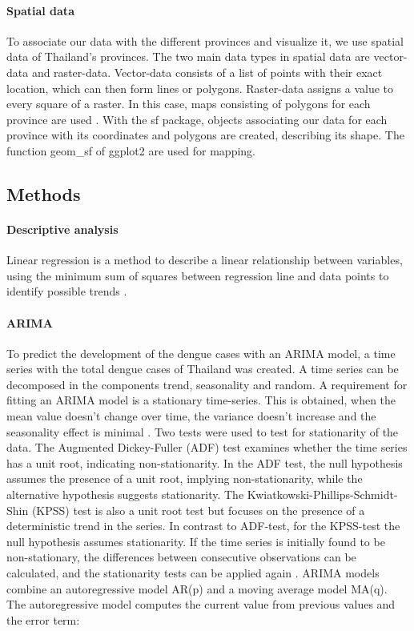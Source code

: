	\paragraph{Spatial data}
	To associate our data with the different provinces and visualize it, we use spatial data of Thailand’s provinces. The two main data types in spatial data are vector-data and raster-data. Vector-data consists of a list of points with their exact location, which can then form lines or polygons. Raster-data assigns a value to every square of a raster. In this case, maps consisting of polygons for each province are used \citep{sds}. With the sf package, objects associating our data for each province with its coordinates and polygons are created, describing its shape. The function geom\_sf of ggplot2 are used for mapping. 
	
	\subsection{Methods}
	
	\paragraph{Descriptive analysis}
	Linear regression is a method to describe a linear relationship between variables, using the minimum sum of squares between regression line and data points to identify possible trends \citep{Schneider2010}. 


	\paragraph{ARIMA}
	
To predict the development of the dengue cases with an ARIMA model, a time series with the total dengue cases of Thailand was created. A time series can be decomposed in the components trend, seasonality and random. 
A requirement for fitting an ARIMA model is a stationary time-series. This is obtained, when the mean value doesn’t change over time, the variance doesn’t increase and the seasonality effect is minimal \citep{Prabhakaran2017}. Two tests were used to test for stationarity of the data. The Augmented Dickey-Fuller (ADF) test examines whether the time series has a unit root, indicating non-stationarity. In the ADF test, the null hypothesis assumes the presence of a unit root, implying non-stationarity, while the alternative hypothesis suggests stationarity. The Kwiatkowski-Phillips-Schmidt-Shin (KPSS) test is also a unit root test but focuses on the presence of a deterministic trend in the series. In contrast to ADF-test, for the KPSS-test the null hypothesis assumes stationarity. If the time series is initially found to be non-stationary, the differences between consecutive observations can be calculated, and the stationarity tests can be applied again \citep{Hyndman2018}.
ARIMA models combine an autoregressive model AR(p) and a moving average model MA(q). 
The autoregressive model computes the current value from previous values and the error term:

